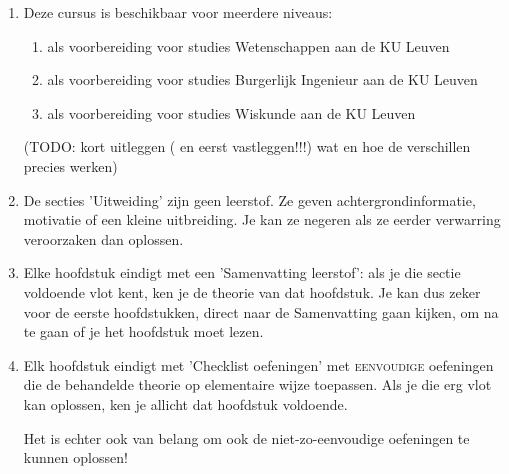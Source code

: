 \documentclass{ximera}
\begin{document}
\begin{remark}
\begin{enumerate}
		\item Deze cursus is beschikbaar voor meerdere niveaus:
		\begin{enumerate}
			\item als voorbereiding voor studies Wetenschappen aan de KU Leuven
			\item als voorbereiding voor studies Burgerlijk Ingenieur aan de KU Leuven
			\item als voorbereiding voor studies Wiskunde aan de KU Leuven
		\end{enumerate}
		(TODO: kort uitleggen ( en eerst vastleggen!!!)  wat en hoe de verschillen precies werken)
		\item De secties 'Uitweiding' zijn geen leerstof. Ze geven achtergrondinformatie, motivatie of een kleine uitbreiding. Je kan ze negeren als ze eerder verwarring veroorzaken dan oplossen.
		\item Elke hoofdstuk eindigt met een 'Samenvatting leerstof': als je die sectie voldoende vlot kent, ken je de theorie van dat hoofdstuk. Je kan dus zeker voor de eerste hoofdstukken, direct naar de Samenvatting gaan kijken, om na te gaan of je het hoofdstuk moet lezen.
		\item Elk hoofdstuk eindigt met 'Checklist oefeningen' met \textsc{eenvoudige} oefeningen die de behandelde theorie op elementaire wijze toepassen. Als je die erg vlot kan oplossen, ken je allicht dat hoofdstuk voldoende. 
		
		Het is echter ook van belang om ook de niet-zo-eenvoudige oefeningen te kunnen oplossen! 
		
	\end{enumerate}
\end{remark}
\end{document}
